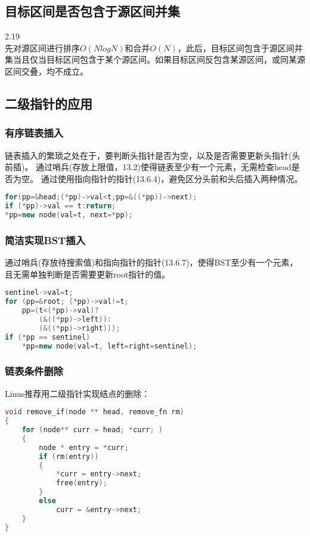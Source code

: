 \subsection{目标区间是否包含于源区间并集}
\cite{bop}2.19\\
先对源区间进行排序$O(NlogN)$和合并$O(N)$，此后，目标区间包含于源区间并集当且仅当目标区间包含于某个源区间。如果目标区间反包含某源区间，或同某源区间交叠，均不成立。

\subsection{二级指针的应用}
\subsubsection{有序链表插入}

链表插入的繁琐之处在于，要判断头指针是否为空，以及是否需要更新头指针(头前插)。
通过哨兵(存放上限值，\cite{pp}13.2)使得链表至少有一个元素，无需检查head是否为空。
通过使用指向指针的指针(\cite{pp}13.6.4)，避免区分头前和头后插入两种情况。
\begin{lstlisting}[language=C++]
for(pp=&head;(*pp)->val<t;pp=&((*pp))->next);
if (*pp)->val == t:return; 
*pp=new node(val=t, next=*pp);
\end{lstlisting}
\label{problem:listInsert}

\subsubsection{简洁实现BST插入}
通过哨兵(存放待搜索值)和指向指针的指针(\cite{pp}13.6.7)，使得BST至少有一个元素，且无需单独判断是否需要更新root指针的值。
\begin{lstlisting}[language=C++]
sentinel->val=t;
for (pp=&root; (*pp)->val!=t;
	pp=(t<(*pp)->val)?
		(&((*pp)->left)):
		(&((*pp)->right)));
if (*pp == sentinel)
	*pp=new node(val=t, left=right=sentinel);
\end{lstlisting}
\label{problem:BSTInsert}

\subsubsection{链表条件删除}
Linus推荐用二级指针实现结点的删除：
\begin{lstlisting}[language=C++]
void remove_if(node ** head, remove_fn rm)
{
    for (node** curr = head; *curr; )
    {
        node * entry = *curr;
        if (rm(entry))
        {
            *curr = entry->next;
            free(entry);
        }
        else
            curr = &entry->next;
    }
}
\end{lstlisting}



